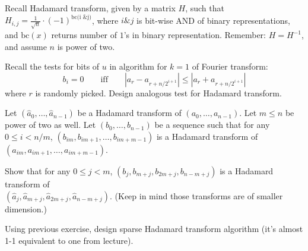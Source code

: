 \documentclass[12pt]{uebung}
\begin{document}
 

\newcommand{\bigo}{\mathcal{O}}
\renewcommand{\aufgname}{Exercise}

Recall Hadamard transform, given by a matrix $H$, such that $H_{i,j} = \frac{1}{\sqrt{n}} \cdot (-1)^{\textrm{bc(i \& j)}}$, where $i \& j$ is bit-wise AND of binary representations, and $\text{bc}(x)$ returns number of $1$'s in binary representation. Remember: $H = H^{-1}$, and assume $n$ is power of two.
\begin{aufg}
Recall the tests for bits of $u$ in algorithm for $k=1$ of Fourier transform:
$$b_{i} = 0 \quad\quad\text{iff}\quad\quad |a_r - a_{r+n/2^{i+1}}| \le |a_r + a_{r+n/2^{i+1}}|$$
where $r$ is randomly picked. Design analogous test for Hadamard transform.
\end{aufg}

\begin{aufg}[2 pts]
Let $(\hat{a}_0,\ldots,\hat{a}_{n-1})$ be a Hadamard transform of $(a_0,\ldots,a_{n-1})$. Let $m \le n$ be power of two as well. Let $(b_0,\ldots,b_{n-1})$ be a sequence such that for any $0 \le i < n/m$, $(b_{im},b_{im+1},\ldots,b_{im+m-1})$ is a Hadamard transform of $(a_{im},a_{im+1},\ldots,a_{im+m-1})$. 

Show that for any $0 \le j < m$, $(b_{j},b_{m+j}, b_{2m+j}, b_{n-m+j})$ is a Hadamard transform of\\ $(\hat{a}_{j},\hat{a}_{m+j}, \hat{a}_{2m+j}, \hat{a}_{n-m+j})$. (Keep in mind those transforms are of smaller dimension.)
\end{aufg}

\begin{aufg}
Using previous exercise, design sparse Hadamard transform algorithm (it's almost 1-1 equivalent to one from lecture).
\end{aufg}
\end{document}
